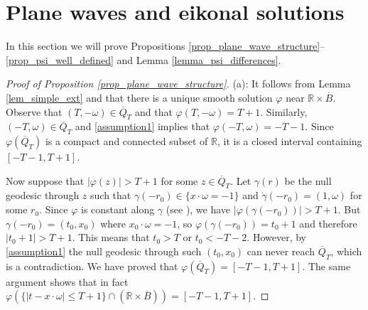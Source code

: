 \documentclass[11pt,letterpaper]{amsart}
\theoremstyle{definition}
\numberwithin{equation}{section}
\newcommand{\mR}{\mathbb{R}}                    %
\newcommand{\ol}[1]{\overline{#1}}
\begin{document}
\section{Plane waves and eikonal solutions} \label{sec_plane_waves}

In this section we will prove Propositions \ref{prop_plane_wave_structure}--\ref{prop_psi_well_defined} and Lemma \ref{lemma_psi_differences}.

\begin{proof}[Proof of Proposition \ref{prop_plane_wave_structure}]
(a): It follows from Lemma \ref{lem_simple_ext} and \cite[Lemma A.1]{oksanen2024} that there is a unique smooth solution $\varphi$ near $\mR \times \ol{B}$. Observe that $(T, -\omega) \in \ol{Q}_T$ and that $\varphi(T, -\omega) = T + 1$. Similarly, $(-T, \omega) \in \ol{Q}_T$ and \eqref{assumption1} implies that $\varphi(-T, \omega) = -T - 1$.
Since $\varphi(\ol{Q}_T)$ is a compact and connected subset of $\mR$, it is a closed interval containing $[-T-1,T+1]$.

Now suppose that $|\varphi(z)| > T+1$ for some $z \in \ol{Q}_T$. Let $\gamma(r)$ be the null geodesic through $z$ such that $\gamma(-r_0) \in \{ x \cdot \omega = -1 \}$ and $\dot{\gamma}(-r_0) = (1,\omega)$ for some $r_0$. Since $\varphi$ is constant along $\gamma$ (see \cite[Lemma A.1]{oksanen2024}), we have $|\varphi(\gamma(-r_0))| > T+1$. But $\gamma(-r_0) = (t_0,x_0)$ where $x_0 \cdot \omega = -1$, so $\varphi(\gamma(-r_0)) = t_0+1$ and therefore $|t_0+1| > T+1$. This means that $t_0 > T$ or $t_0 < -T-2$. However, by \eqref{assumption1} the null geodesic through such $(t_0,x_0)$ can never reach $\ol{Q}_T$, which is a contradiction. We have proved that $\varphi(\ol{Q}_T) = [-T-1,T+1]$. The same argument shows that in fact $\varphi(\{|t - x \cdot \omega| \leq T+1 \} \cap (\mR \times \ol{B})) = [-T-1,T+1]$.




\end{proof}
\end{document}
